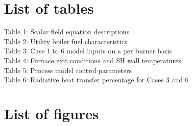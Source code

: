\documentclass[11pt,cleanfoot]{asme2ej}
\begin{document}
%



\newpage


\newpage

\section{List of tables}

Table 1: Scalar field equation descriptions\\

Table 2: Utility boiler fuel characteristics\\

Table 3: Case 1 to 6 model inputs on a per burner basis\\

Table 4: Furnace exit conditions and SH wall temperatures\\

Table 5: Process model control parameters\\

Table 6: Radiative heat transfer percentage for Cases 3 and 6
\newpage

\section{List of figures}
\end{document}
